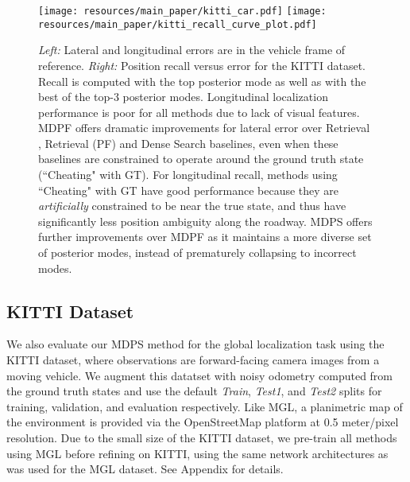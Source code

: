                         
        \begin{figure}[t]
            \centering
            \texttt{[image: resources/main\_paper/kitti\_car.pdf]}
            \hspace{0.3in}
            \texttt{[image: resources/main\_paper/kitti\_recall\_curve\_plot.pdf]}
            \caption{\small{\emph{Left:} Lateral and longitudinal errors are in the vehicle frame of reference. \emph{Right:} Position recall versus error for the KITTI \cite{Geiger2013IJRRKitti} dataset. Recall is computed with the top posterior mode as well as with the best of the top-3 posterior modes. Longitudinal localization performance is poor for all methods due to lack of visual features. MDPF \cite{younis2023mdpf} offers dramatic improvements for lateral error over Retrieval \cite{noe2020eccv}, Retrieval (PF) \cite{9635972GausePF} and Dense Search \cite{sarlin2023orienternet} baselines, even when these baselines are constrained to operate around the ground truth state (``Cheating" with GT). For longitudinal recall, methods using ``Cheating" with GT have good performance because they are \emph{artificially} constrained to be near the true state, and thus have significantly less position ambiguity along the roadway. MDPS offers further improvements over MDPF as it maintains a more diverse set of posterior modes, instead of prematurely collapsing to incorrect modes.}}
            \label{fig:kitti_recall_curves}
            \vskip -0.1in
        \end{figure}
        
              
            

        \subsection{KITTI Dataset}
    

    
            We also evaluate our MDPS method for the global localization task using the KITTI \cite{Geiger2013IJRRKitti} dataset, where observations are forward-facing camera images from a moving vehicle. We augment this datatset with noisy odometry computed from the ground truth states and use the default \emph{Train}, \emph{Test1}, and \emph{Test2} splits for training, validation, and evaluation respectively. Like MGL, a planimetric map of the environment is provided via the OpenStreetMap platform \cite{OpenStreetMap} at 0.5 meter/pixel resolution. %
            Due to the small size of the KITTI dataset, we pre-train all methods using MGL before refining on KITTI, using the same network architectures as was used for the MGL dataset. See Appendix for details.
    
